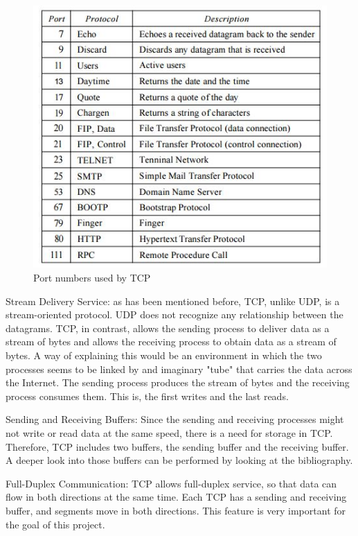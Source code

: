 \begin{figure}[H]
\begin{center}
\includegraphics[scale=1]{TCP1}
\caption{Port numbers used by TCP}
\end{center}
\end{figure}

Stream Delivery Service: as has been mentioned before, TCP, unlike UDP, is a stream-oriented protocol. UDP does not recognize any relationship between the datagrams. TCP, in contrast, allows the sending process to deliver data as a stream of bytes and allows the receiving process to obtain data as a stream of bytes. A way of explaining this would be an environment in which the two processes seems to be linked by and imaginary "tube" that carries the data across the Internet. The sending process produces the stream of bytes and the receiving process consumes them. This is, the first writes and the last reads. 

Sending and Receiving Buffers: Since the sending and receiving processes might not write or read data at the same speed, there is a need for storage in TCP. Therefore, TCP includes two buffers, the sending buffer and the receiving buffer. A deeper look into those buffers can be performed by looking at the bibliography. 

Full-Duplex Communication: TCP allows full-duplex service, so that data can flow in both directions at the same time. Each TCP has a sending and receiving buffer, and segments move in both directions. This feature is very important for the goal of this project.

